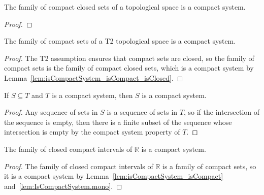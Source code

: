 \begin{lemma}\label{lem:isCompactSystem_isCompact_isClosed}
  \leanok
The family of compact closed sets of a topological space is a compact system.
\end{lemma}

\begin{proof}\leanok

\end{proof}


\begin{lemma}\label{lem:isCompactSystem_isCompact}
  \leanok
The family of compact sets of a T2 topological space is a compact system.
\end{lemma}

\begin{proof}\leanok
The T2 assumption ensures that compact sets are closed, so the family of compact sets is the family of compact closed sets, which is a compact system by Lemma~\ref{lem:isCompactSystem_isCompact_isClosed}.
\end{proof}


\begin{lemma}\label{lem:IsCompactSystem.mono}
  \leanok
If $S \subseteq T$ and $T$ is a compact system, then $S$ is a compact system.
\end{lemma}

\begin{proof}\leanok
Any sequence of sets in $S$ is a sequence of sets in $T$, so if the intersection of the sequence is empty, then there is a finite subset of the sequence whose intersection is empty by the compact system property of $T$.
\end{proof}


\begin{lemma}\label{lem:isCompactSystem_Icc}
  \leanok
The family of closed compact intervals of $\mathbb{R}$ is a compact system.
\end{lemma}

\begin{proof}\leanok
The family of closed compact intervals of $\mathbb{R}$ is a family of compact sets, so it is a compact system by Lemma~\ref{lem:isCompactSystem_isCompact} and~\ref{lem:IsCompactSystem.mono}.
\end{proof}


